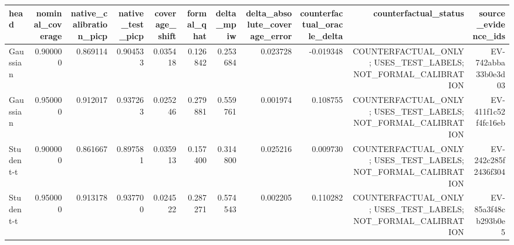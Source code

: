 \begin{tabular}{lrrrrrrrrrr}
\hline
head & nominal\_coverage & native\_calibration\_picp & native\_test\_picp & coverage\_shift & formal\_qhat & delta\_mpiw & delta\_absolute\_coverage\_error & counterfactual\_oracle\_delta & counterfactual\_status & source\_evidence\_ids \\
\hline
Gaussian & 0.900000 & 0.869114 & 0.904533 & 0.035418 & 0.126842 & 0.253684 & 0.023728 & -0.019348 & COUNTERFACTUAL\_ONLY; USES\_TEST\_LABELS; NOT\_FORMAL\_CALIBRATION & EV-742abba33b0e3d03 \\
Gaussian & 0.950000 & 0.912017 & 0.937263 & 0.025246 & 0.279881 & 0.559761 & 0.001974 & 0.108755 & COUNTERFACTUAL\_ONLY; USES\_TEST\_LABELS; NOT\_FORMAL\_CALIBRATION & EV-411f1c52f4fc16eb \\
Student-t & 0.900000 & 0.861667 & 0.897581 & 0.035913 & 0.157400 & 0.314800 & 0.025216 & 0.009730 & COUNTERFACTUAL\_ONLY; USES\_TEST\_LABELS; NOT\_FORMAL\_CALIBRATION & EV-242c285f2436f304 \\
Student-t & 0.950000 & 0.913178 & 0.937700 & 0.024522 & 0.287271 & 0.574543 & 0.002205 & 0.110282 & COUNTERFACTUAL\_ONLY; USES\_TEST\_LABELS; NOT\_FORMAL\_CALIBRATION & EV-85a3f48cb293b0e5 \\
\hline
\end{tabular}
